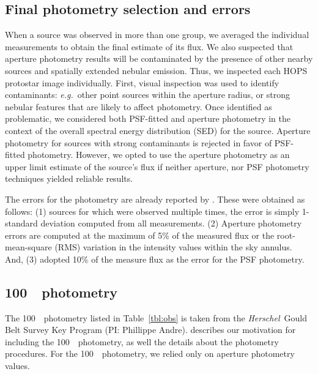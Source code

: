 \documentclass[manuscript]{aastex61}
\newcommand{\herschel}{{\em Herschel}}
\begin{document}
\subsection{Final photometry selection and errors}
\label{sec-eyeballs}
When a source was observed in more than one group, we averaged the individual measurements to obtain the final estimate of its flux.  We also suspected that aperture photometry results will be contaminated by the presence of other nearby sources and spatially extended nebular emission.  Thus, we inspected each HOPS protostar image individually.  First, visual inspection was used to identify contaminants: {\it e.g.}\ other point sources within the aperture radius, or strong nebular features that are likely to affect photometry.  Once identified as problematic, we considered both PSF-fitted and aperture photometry in the context of the overall spectral energy distribution (SED) for the source.  Aperture photometry for sources with strong contaminants is rejected in favor of PSF-fitted photometry.  However, we opted to use the aperture photometry as an upper limit estimate of the source's flux if neither aperture, nor PSF photometry techniques yielded reliable results.
\par
The errors for the photometry are already reported by \cite{furlan}.  These were obtained as follows: (1) sources for which were observed multiple times, the error is simply 1-standard deviation computed from all measurements.  (2) Aperture photometry errors are computed at the maximum of 5\% of the measured flux or the root-mean-square (RMS) variation in the intensity values within the sky annulus.  And, (3) \cite{furlan} adopted 10\% of the measure flux as the error for the PSF photometry.

\subsection{100~\micron\ photometry}
\label{sec:gb100um}
The 100~\micron\ photometry listed in Table~\ref{tbl:obs} is taken from the \herschel\ Gould Belt Survey Key Program (PI: Phillippe Andre).  \cite{pbrpaper} describes our motivation for including the 100~\micron\ photometry, as well the details about the photometry procedures.  For the 100~\micron\ photometry, we relied only on aperture photometry values.
\end{document}
